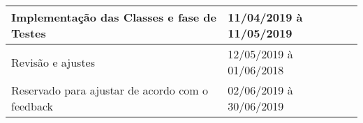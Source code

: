 \begin{table}[h!]
\begin{tabular}{|l|l|}
Implementação das Classes e fase de Testes                                                                                                                           & 11/04/2019 à 11/05/2019                \\ \hline
Revisão e ajustes                                                                                                                                                    & 12/05/2019 à 01/06/2018                \\ \hline
Reservado para ajustar de acordo com o  feedback                                                                                                                     & 02/06/2019 à 30/06/2019                \\ \hline
\end{tabular}
\end{table}
